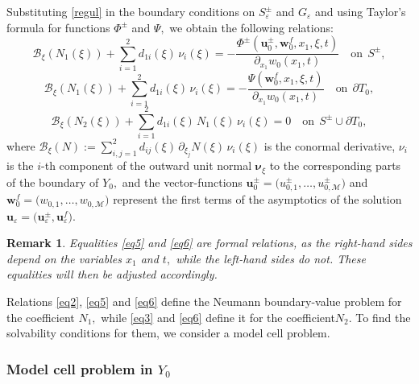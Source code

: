 \documentclass[reqno]{amsart}            %
\newtheorem{remark}{Remark}[section]
\numberwithin{equation}{section}
\begin{document}
	Substituting \eqref{regul} in the boundary conditions on $S_\varepsilon^\pm$ and $G_\varepsilon$ and using Taylor's formula for functions $\Phi^\pm$ and $\Psi,$ we obtain the following relations:
	\begin{equation}\label{eq5}
		\mathcal{B}_\xi(N_1(\xi)) + \sum_{i=1}^{2} d_{1 i}(\xi)\, \nu_i(\xi) = - \frac{\Phi^\pm(\mathbf{u}^\pm_0, \mathbf{w}^f_0, x_1, \xi, t)}{\partial_{x_1} w_0(x_1,t)} \quad \text{on} \ \ S^\pm,
	\end{equation}
	\begin{equation}\label{eq6}
		\mathcal{B}_\xi(N_1(\xi)) + \sum_{i=1}^{2} d_{1 i}(\xi)\, \nu_i(\xi) = - \frac{\Psi(\mathbf{w}^f_0, x_1, \xi, t)}{\partial_{x_1} w_0(x_1,t)} \quad \text{on} \ \ \partial T_0,
	\end{equation}
	\begin{equation}\label{eq7}
		\mathcal{B}_\xi(N_{2}(\xi)) + \sum_{i=1}^{2} d_{1 i}(\xi)\, N_1(\xi)\, \nu_i(\xi) = 0 \quad \text{on} \ \ S^\pm \cup \partial T_0,
	\end{equation}
	where $\mathcal{B}_\xi(N) := \sum_{i, j =1}^{2} d_{i j}(\xi)\, \partial_{\xi_j}N(\xi)\, \nu_i(\xi)$ is the conormal derivative, $\nu_i$ is the $i$-th component of the outward unit normal $\boldsymbol{\nu}_\xi$ to the corresponding parts of the boundary of $Y_0,$  and  the vector-functions $\mathbf{u}^\pm_0 = \big(u^\pm_{0,1},\ldots,u^\pm_{0, \mathcal{M}}\big)$ and
	$\mathbf{w}^f_0 = \big(w_{0,1},\ldots,w_{0, \mathcal{M}}\big)$ represent the first terms of the asymptotics of  the solution $\mathbf{u}_\varepsilon = \big(\mathbf{u}^\pm_\varepsilon, \mathbf{u}^f_\varepsilon \big).$ 
	
	\begin{remark}\label{rem-4-1}
		Equalities \eqref{eq5} and \eqref{eq6} are formal relations, as the right-hand sides depend on the variables $x_1$ and $t,$ while the left-hand sides do not.  These equalities will then be adjusted accordingly.
	\end{remark}
	
	Relations \eqref{eq2}, \eqref{eq5} and \eqref{eq6} define the Neumann boundary-value problem for the coefficient $N_1,$ while \eqref{eq3} and \eqref{eq6} define it for the coefficient$N_{2}.$  To find the solvability conditions for them, we consider a model cell problem.
	
	\subsubsection{Model cell problem in $Y_0$}
	
\end{document}
